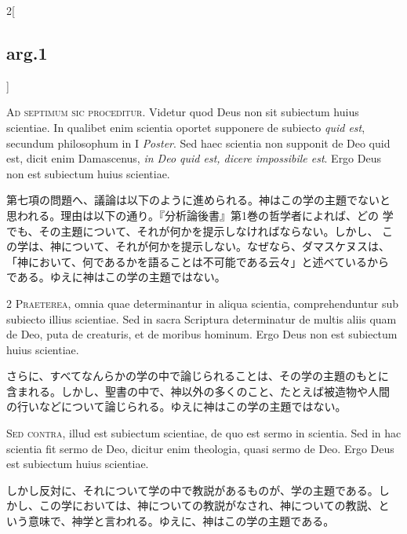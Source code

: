 \documentclass[
paper=a4paper,
fontsize=10pt,
jafontsize=9pt,
titlepage
]{jlreq}
\begin{document}
\begin{paracol}{2}[\subsection{arg.1}]

{\Huge A}{\scshape d septimum sic proceditur}. Videtur quod Deus non
sit subiectum huius scientiae. In qualibet enim scientia oportet
supponere de subiecto {\itshape quid est}, secundum philosophum in I
{\itshape Poster}. Sed haec scientia non supponit de Deo quid est,
dicit enim Damascenus, {\itshape in Deo quid est, dicere impossibile
est}. Ergo Deus non est subiectum huius scientiae.

\switchcolumn

第七項の問題へ、議論は以下のように進められる。神はこの学の主題でないと
思われる。理由は以下の通り。『分析論後書』第1巻の哲学者によれば、どの
学でも、その主題について、それが何かを提示しなければならない。しかし、
この学は、神について、それが何かを提示しない。なぜなら、ダマスケヌスは、
「神において、何であるかを語ることは不可能である云々」と述べているから
である。ゆえに神はこの学の主題ではない。


{\scshape 2 Praeterea}, omnia quae determinantur in aliqua scientia,
comprehenduntur sub subiecto illius scientiae. Sed in sacra Scriptura
determinatur de multis aliis quam de Deo, puta de creaturis, et de
moribus hominum. Ergo Deus non est subiectum huius scientiae.

\switchcolumn

さらに、すべてなんらかの学の中で論じられることは、その学の主題のもとに
含まれる。しかし、聖書の中で、神以外の多くのこと、たとえば被造物や人間
の行いなどについて論じられる。ゆえに神はこの学の主題ではない。

\switchcolumn*[\subsection{s.c.}]

{\scshape Sed contra}, illud est subiectum scientiae, de quo est sermo
in scientia. Sed in hac scientia fit sermo de Deo, dicitur enim
theologia, quasi sermo de Deo. Ergo Deus est subiectum huius
scientiae.

\switchcolumn

しかし反対に、それについて学の中で教説があるものが、学の主題である。し
かし、この学においては、神についての教説がなされ、神についての教説、と
いう意味で、神学と言われる。ゆえに、神はこの学の主題である。



\end{paracol}
\end{document}
